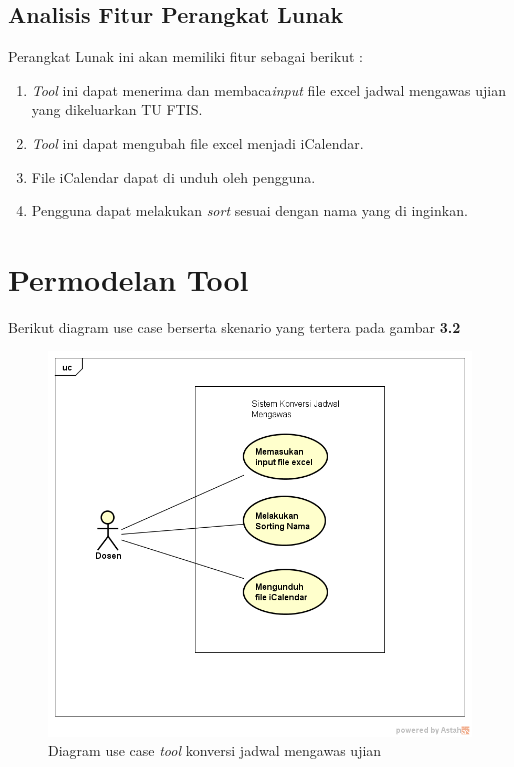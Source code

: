 \subsection{Analisis Fitur Perangkat Lunak}
Perangkat Lunak ini akan memiliki fitur sebagai berikut : 
	\begin{enumerate}
		\item \textit{Tool} ini dapat menerima dan membaca\textit{input} file excel jadwal mengawas ujian yang dikeluarkan TU FTIS.
		\item \textit{Tool} ini dapat mengubah file excel menjadi iCalendar.
		\item File iCalendar dapat di unduh oleh pengguna.
		\item Pengguna dapat melakukan \textit{sort} sesuai dengan nama yang di inginkan.
	\end{enumerate}
	
\section{Permodelan Tool}

Berikut diagram use case berserta skenario yang tertera pada gambar \textbf{3.2}

\begin{figure}[h]
	\centering
	\includegraphics[scale=0.5]{Gambar/useCaseJadwal}
	\caption{Diagram use case \textit{tool} konversi jadwal mengawas ujian}
	\end{figure}

